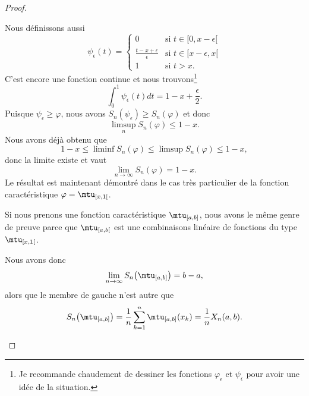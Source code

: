 \begin{proof}
\begin{subproof}
		Nous définissons aussi
		\begin{equation}
			\psi_{\epsilon}(t)=\begin{cases}
				0                                 & \text{si } t\in \mathopen[ 0 , x-\epsilon [ \\
				\frac{ t-x+\epsilon }{ \epsilon } & \text{si } t\in\mathopen[ x-\epsilon , x [  \\
				1                                 & \text{si } t>x.
			\end{cases}
		\end{equation}
		C'est encore une fonction continue et nous trouvons\footnote{Je recommande chaudement de dessiner les fonctions \( \varphi_{\epsilon}\) et \( \psi_{\epsilon}\) pour avoir une idée de la situation.}
		\begin{equation}
			\int_0^1\psi_{\epsilon}(t)dt=1-x+\frac{ \epsilon }{2}.
		\end{equation}
		Puisque \( \psi_{\epsilon}\geq\varphi\), nous avons \( S_n(\psi_{\epsilon})\geq S_n(\varphi)\) et donc
		\begin{equation}
			\limsup_{n}S_n(\varphi)\leq 1-x.
		\end{equation}
		Nous avons déjà obtenu que
		\begin{equation}
			1-x\leq\liminf S_n(\varphi)\leq \limsup S_n(\varphi)\leq 1-x,
		\end{equation}
		donc la limite existe et vaut
		\begin{equation}
			\lim_{n\to \infty} S_n(\varphi)=1-x.
		\end{equation}
		Le résultat est maintenant démontré dans le cas très particulier de la fonction caractéristique \( \varphi=\mtu_{\mathopen[ x , 1 [}\).

		Si nous prenons une fonction caractéristique \( \mtu_{\mathopen[ a , b \mathclose]}\), nous avons le même genre de preuve parce que \( \mtu_{\mathopen[ a , b [}\) est une combinaisons linéaire de fonctions du type \( \mtu_{\mathopen[ x , 1 [}\).

		Nous avons donc
		\begin{equation}
			\lim_{n\to \infty} S_n\big( \mtu_{\mathopen[ a , b \mathclose]} \big)=b-a,
		\end{equation}
		alors que le membre de gauche n'est autre que
		\begin{equation}
			S_n\big( \mtu_{\mathopen[ a , b \mathclose]} \big)=\frac{1}{ n }\sum_{k=1}^n\mtu_{\mathopen[ a , b \mathclose]}(x_k)=\frac{1}{ n }X_n(a,b).
		\end{equation}


\end{subproof}
\end{proof}

